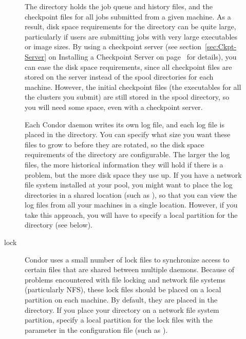 \begin{description}
\begin{description}
\item[\File{spool}] The  directory holds the job queue
and history files,
and the checkpoint files for all jobs submitted from a given machine.
As a result, disk space requirements for the  directory
can be quite large,
particularly if users are submitting jobs with very large
executables or image sizes.
By using a checkpoint server
(see section~\ref{sec:Ckpt-Server} on Installing a Checkpoint Server on
page~\pageref{sec:Ckpt-Server} for details),
you can ease the disk
space requirements, since all checkpoint files are stored on the
server instead of the spool directories for each machine.  However,
the initial checkpoint files (the executables for all the clusters you
submit) are still stored in the spool directory, so you will need
%
%
some space, even with a checkpoint server.

\item[\File{log}] Each Condor daemon writes its own log file,
and each log file is placed
in the  directory.  You can specify what size you want these files
to grow to before they are rotated,
%
%
so the disk space requirements of
the directory are configurable.
The larger the log files, the more
historical information they will hold if there is a problem, but the
more disk space they use up.  If you have a network file system
installed at your pool, you might want to place the log directories in
a shared location (such as ),
so that you can view the log files from all your machines in a single
location.  However, if you take this approach, you will have to
specify a local partition for the  directory (see below).

\item[lock] Condor uses a small number of lock files to synchronize
access to certain files that are shared between multiple daemons.
Because of problems encountered with file locking and network
file systems (particularly NFS), these lock files should be placed on a
local partition on each machine.  By default, they are placed in
the  directory.  If you place your 
directory on a network file system partition,
specify a local partition for the
lock files with the  parameter in the configuration file (such as
).


\end{description}
\end{description}
